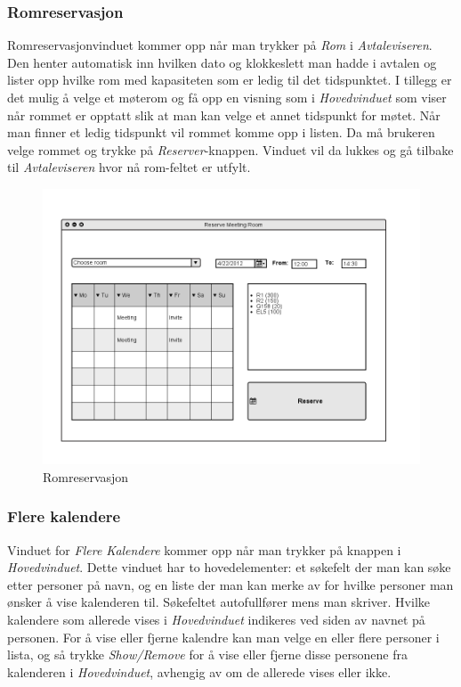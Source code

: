\subsubsection{Romreservasjon}
Romreservasjonvinduet kommer opp når man trykker på \emph{Rom} i \emph{Avtaleviseren}. Den henter automatisk inn hvilken dato og klokkeslett man hadde i avtalen og lister opp hvilke rom med kapasiteten som er ledig til det tidspunktet. I tillegg er det mulig å velge et møterom og få opp en visning som i \emph{Hovedvinduet} som viser når rommet er opptatt slik at man kan velge et annet tidspunkt for møtet. Når man finner et ledig tidspunkt vil rommet komme opp i listen. Da må brukeren velge rommet og trykke på \emph{Reserver}-knappen. Vinduet vil da lukkes og gå tilbake til \emph{Avtaleviseren} hvor nå rom-feltet er utfylt.

\begin{figure}[H]
\centering
\includegraphics[scale=0.65]{images/romreservasjon.png}
\caption{Romreservasjon}
\label{romreservasjon_image}
\end{figure}

\subsubsection{Flere kalendere}
Vinduet for \emph{Flere Kalendere} kommer opp når man trykker på knappen i \emph{Hovedvinduet}. Dette vinduet har to hovedelementer: et søkefelt der man kan søke etter personer på navn, og en liste der man kan merke av for hvilke personer man ønsker å vise kalenderen til. Søkefeltet autofullfører mens man skriver. Hvilke kalendere som allerede vises i \emph{Hovedvinduet} indikeres ved siden av navnet på personen. For å vise eller fjerne kalendre kan man velge en eller flere personer i lista, og så trykke \emph{Show/Remove} for å vise eller fjerne disse personene fra kalenderen i \emph{Hovedvinduet}, avhengig av om de allerede vises eller ikke. 

